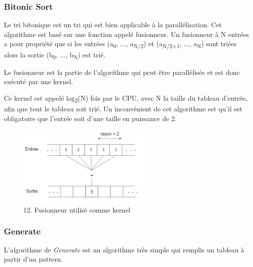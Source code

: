 \documentclass{report}
\begin{document}
\begin{enumerate}
\subsubsection{Bitonic Sort}
Le tri bitonique est un tri qui est bien applicable à la parallélisation. Cet algorithme est basé sur une fonction appelé fusionneur. Un fusionneur à N entrées a pour propriété que si les entrées (a\textsubscript{0}, ..., a\textsubscript{N/2}) et (a\textsubscript{N/2+1}, ..., a\textsubscript{N}) sont triées alors la sortie (b\textsubscript{0}, ..., b\textsubscript{N}) est trié.\newline

Le fusionneur est la partie de l'algorithme qui peut être parallélisée et est donc exécuté par une kernel.\newline

Ce kernel est appelé log\textsubscript{2}(N) fois par le CPU, avec N la taille du tableau d'entrée, afin que tout le tableau soit trié. Un inconvénient de cet algorithme est qu'il est obligatoire que l'entrée soit d'une taille en puissance de 2. 

\begin{figure}[!h]
\begin{center}
\includegraphics[height=150]{images_finales/schema_stencil.png}
\end{center}
\caption{12. Fusionneur utilisé comme kernel}
\label{test}
\end{figure} \newline

\subsubsection{Generate}
L'algorithme de \textit{Generate} est un algorithme très simple qui remplis un tableau à partir d'un pattern.


\end{enumerate}
\end{document}
